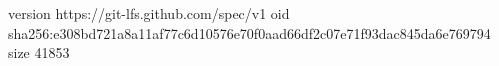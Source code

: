 version https://git-lfs.github.com/spec/v1
oid sha256:e308bd721a8a11af77c6d10576e70f0aad66df2c07e71f93dac845da6e769794
size 41853
